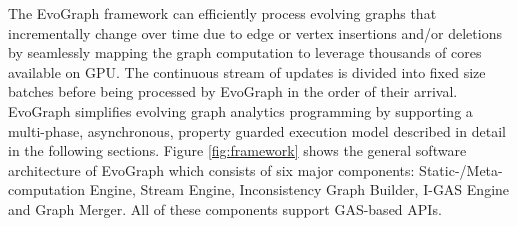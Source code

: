%
%
%
%
%
%
%

The EvoGraph framework can efficiently process evolving graphs that incrementally change over time due to edge or vertex insertions and/or deletions by seamlessly mapping the graph computation to leverage thousands of cores available on GPU.  The continuous stream of updates is divided into fixed size batches before being processed by EvoGraph in the order of their arrival. EvoGraph simplifies evolving graph analytics programming by supporting a multi-phase, asynchronous, property guarded execution model described in detail in the following sections. Figure \ref{fig:framework} shows the general software architecture of EvoGraph which consists of six major components: Static-/Meta-computation Engine, Stream Engine, Inconsistency Graph Builder, I-GAS Engine and Graph Merger.  All of these components support GAS-based APIs. 

